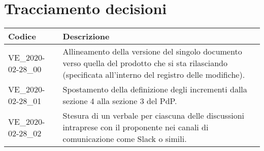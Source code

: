 \section{Tracciamento decisioni}
\renewcommand{\arraystretch}{1.8}

\begin{longtable}{|p{5cm}|p{8cm}|}
	\hline
	
	\rowcolor{header}
	\textbf{Codice} & \textbf{Descrizione} \\
	
	\hline
	
	VE\_2020-02-28\_00 & Allineamento della versione del singolo documento verso quella del prodotto che si sta rilasciando (specificata all'interno del registro delle modifiche).\\
	VE\_2020-02-28\_01 & Spostamento della definizione degli incrementi dalla sezione 4 alla sezione 3 del PdP. \\
	VE\_2020-02-28\_02 & Stesura di un verbale per ciascuna delle discussioni intraprese con il proponente nei canali di comunicazione come Slack o simili. \\
	
	\hline
\end{longtable}